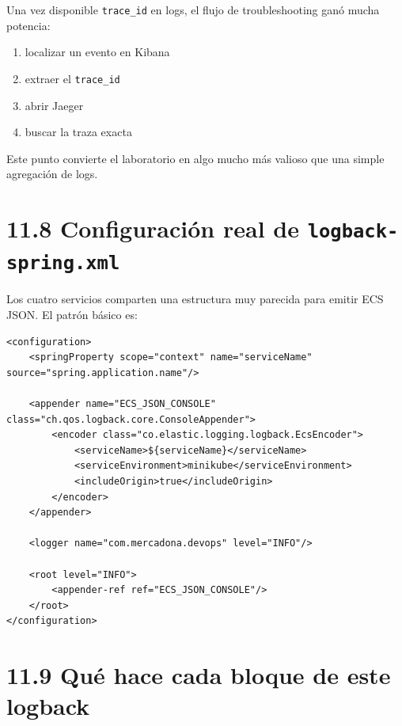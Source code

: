 \documentclass[
a4paper,
12pt]{report}
\providecommand{\tightlist}{%
  \setlength{\itemsep}{0pt}\setlength{\parskip}{0pt}}
\begin{document}
Una vez disponible \texttt{trace\_id} en logs, el flujo de
troubleshooting ganó mucha potencia:

\begin{enumerate}
\def\labelenumi{\arabic{enumi}.}
\tightlist
\item
  localizar un evento en Kibana\\
\item
  extraer el \texttt{trace\_id}\\
\item
  abrir Jaeger\\
\item
  buscar la traza exacta
\end{enumerate}

Este punto convierte el laboratorio en algo mucho más valioso que una
simple agregación de logs.

\section{\texorpdfstring{11.8 Configuración real de
\texttt{logback-spring.xml}}{11.8 Configuración real de logback-spring.xml}}\label{configuraciuxf3n-real-de-logback-spring.xml}

Los cuatro servicios comparten una estructura muy parecida para emitir
ECS JSON. El patrón básico es:

\begin{verbatim}
<configuration>
    <springProperty scope="context" name="serviceName" source="spring.application.name"/>

    <appender name="ECS_JSON_CONSOLE" class="ch.qos.logback.core.ConsoleAppender">
        <encoder class="co.elastic.logging.logback.EcsEncoder">
            <serviceName>${serviceName}</serviceName>
            <serviceEnvironment>minikube</serviceEnvironment>
            <includeOrigin>true</includeOrigin>
        </encoder>
    </appender>

    <logger name="com.mercadona.devops" level="INFO"/>

    <root level="INFO">
        <appender-ref ref="ECS_JSON_CONSOLE"/>
    </root>
</configuration>
\end{verbatim}

\section{11.9 Qué hace cada bloque de este
logback}\label{quuxe9-hace-cada-bloque-de-este-logback}
\end{document}

